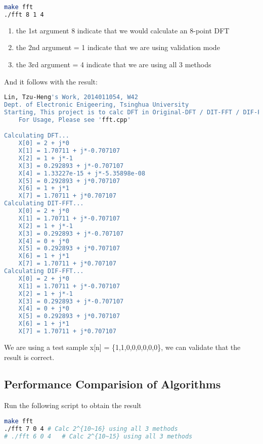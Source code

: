 \documentclass[UTF8,a4paper]{ctexart}
\begin{document}
    \begin{lstlisting}[language=sh]
make fft
./fft 8 1 4
    \end{lstlisting}


\begin{enumerate}
\item the 1st argument 8 indicate that we would calculate an 8-point DFT
\item the 2nd argument = 1 indicate that we are using validation mode
\item the 3rd argument = 4 indicate that we are using all 3 methods
\end{enumerate}   

And it follows with the result:

    \begin{lstlisting}[language=sh]
Lin, Tzu-Heng's Work, 2014011054, W42
Dept. of Electronic Enigeering, Tsinghua University
Starting, This project is to calc DFT in Original-DFT / DIT-FFT / DIF-FFT...
	For Usage, Please see 'fft.cpp' 

Calculating DFT...
	X[0] = 2 + j*0
	X[1] = 1.70711 + j*-0.707107
	X[2] = 1 + j*-1
	X[3] = 0.292893 + j*-0.707107
	X[4] = 1.33227e-15 + j*-5.35898e-08
	X[5] = 0.292893 + j*0.707107
	X[6] = 1 + j*1
	X[7] = 1.70711 + j*0.707107
Calculating DIT-FFT...
	X[0] = 2 + j*0
	X[1] = 1.70711 + j*-0.707107
	X[2] = 1 + j*-1
	X[3] = 0.292893 + j*-0.707107
	X[4] = 0 + j*0
	X[5] = 0.292893 + j*0.707107
	X[6] = 1 + j*1
	X[7] = 1.70711 + j*0.707107
Calculating DIF-FFT...
	X[0] = 2 + j*0
	X[1] = 1.70711 + j*-0.707107
	X[2] = 1 + j*-1
	X[3] = 0.292893 + j*-0.707107
	X[4] = 0 + j*0
	X[5] = 0.292893 + j*0.707107
	X[6] = 1 + j*1
	X[7] = 1.70711 + j*0.707107
    \end{lstlisting}

We are using a test sample x[n] = \{1,1,0,0,0,0,0,0\}, we can validate that the result is correct.




\newpage
\subsection{Performance Comparision of Algorithms}


Run the following script to obtain the result

    \begin{lstlisting}[language=sh]
make fft
./fft 7 0 4	# Calc 2^{10~16} using all 3 methods
# ./fft 6 0 4	# Calc 2^{10~15} using all 3 methods
    \end{lstlisting}
    
\end{document}
